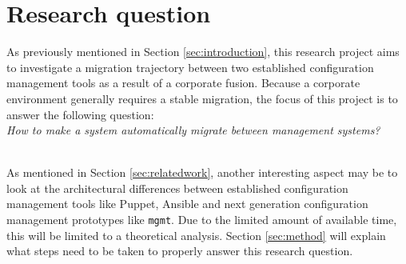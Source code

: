 \section{Research question}\label{sec:researchquestion}
As previously mentioned in Section \ref{sec:introduction}, this research project aims to investigate a migration trajectory between two established configuration management tools as a result of a corporate fusion. Because a corporate environment generally requires a stable migration, the focus of this project is to answer the following question:
\\
\textit{How to make a system automatically migrate between management systems?}

\\
As mentioned in Section \ref{sec:relatedwork}, another interesting aspect may be to look at the architectural differences between established configuration management tools like Puppet, Ansible and next generation configuration management prototypes like \texttt{mgmt}. Due to the limited amount of available time, this will be limited to a theoretical analysis. Section \ref{sec:method} will explain what steps need to be taken to properly answer this research question.
